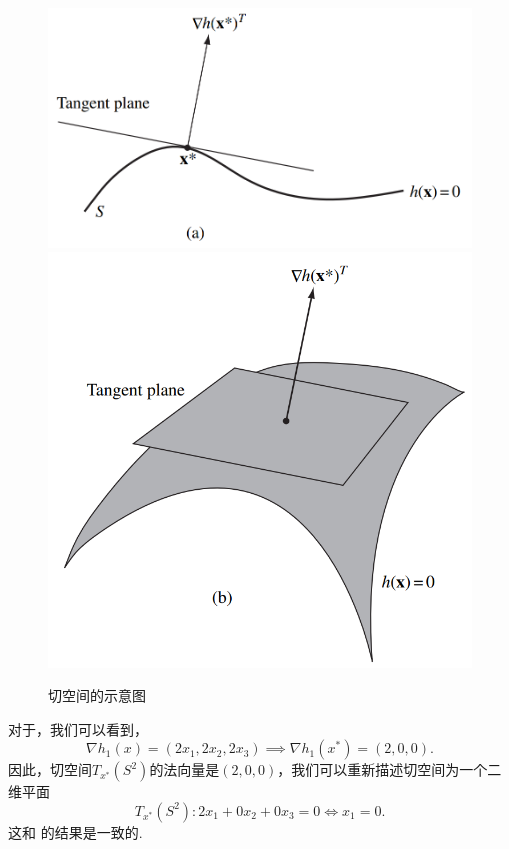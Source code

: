 \begin{figure}
\centering
    \includegraphics[scale=0.4]{Figures/duality/tan-1dim.png}
\centering
    \includegraphics[scale=0.4]{Figures/duality/tan-2dim.png}
\caption{切空间的示意图}
\label{fig:tangent-space}
\end{figure}

对于，我们可以看到，
\[\nabla h_1(x)=(2x_1,2x_2,2x_3)\implies \nabla h_1(x^*)=(2,0,0).\]
因此，切空间$T_{x^*}(S^2)$的法向量是$(2,0,0)$，我们可以重新描述切空间为一个二维平面
\[T_{x^*}(S^2): 2x_1+0x_2+0x_3=0\iff x_1=0.\]
这和 的结果是一致的.

